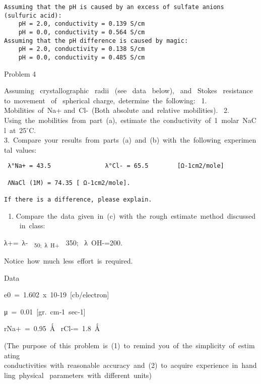 \documentclass{article}
\begin{document}
    \begin{Verbatim}[commandchars=\\\{\}]
Assuming that the pH is caused by an excess of sulfate anions (sulfuric acid):
	pH = 2.0, conductivity = 0.139 S/cm
	pH = 0.0, conductivity = 0.564 S/cm
Assuming that the pH difference is caused by magic:
	pH = 2.0, conductivity = 0.138 S/cm
	pH = 0.0, conductivity = 0.485 S/cm
    \end{Verbatim}

    Problem 4

Assuming~ crystallographic~ radii~ (see~ data~ below),~ and~ Stokes~
resistance~ to~movement~ of~ spherical~charge,~determine~the~following:~
1. Mobilities~of~Na+ and~Cl‐~(Both~absolute~and~relative~mobilities).~
2.
Using~the~mobilities~from~part~(a),~estimate~the~conductivity~of~1~molar~NaCl~at~25$^\circ$C.~
3.~Compare~your~results~from~parts~(a)~and~(b)~with~the~following~experimental~values:~

\begin{verbatim}
 λ°Na+ = 43.5               λ°Cl‐ = 65.5        [Ω‐1cm2/mole]
 
 ΛNaCl (1M) = 74.35 [ Ω‐1cm2/mole].
 
If there is a difference, please explain. 
\end{verbatim}

\begin{enumerate}
\def\labelenumi{\arabic{enumi}.}
\setcounter{enumi}{3}
\itemsep1pt\parskip0pt
\item
  Compare~the~data~given~in~(c)~with~the~rough~estimate~method~discussed~in~class:~
\end{enumerate}

λ+=~λ‐~\textsubscript{~50;~λ~H+~}~350;~ λ~OH-=200.

Notice~how~much~less~effort~is~required.~

Data

e0~=~1.602~x~10‐19~{[}cb/electron{]}

μ~=~0.01~{[}gr.~cm‐1~sec‐1{]}

rNa+~=~0.95~Ǻ~ rCl‐=~1.8~Ǻ~

(The~purpose~of~this~problem~is~(1)~to~remind~you~of~the~simplicity~of~estimating~
conductivities~with~reasonable~accuracy~and~(2)~to~acquire~experience~in~handling~physical~
parameters~with~different~units)~~
\end{document}
